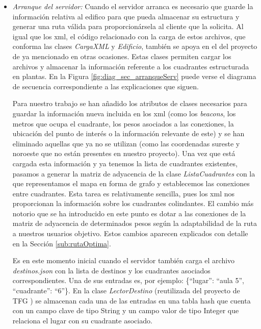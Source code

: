 \begin{itemize}
	\item \textit{Arranque del servidor:} Cuando el servidor arranca es necesario que guarde la información relativa al edifico para que pueda almacenar su estructura y generar una ruta válida para proporcionársela al cliente que la solicita. Al igual que los xml, el código relacionado con la carga de estos archivos, que conforma las clases \textit{CargaXML} y \textit{Edificio}, también se apoya en el del proyecto de \cite{TFGguia} ya mencionado en otras ocasiones. Estas clases permiten cargar los archivos y almacenar la información referente a los cuadrantes estructurada en plantas. En la Figura \ref{fig:diag_sec_arranqueServ} puede verse el diagrama de secuencia correspondiente a las explicaciones que siguen.
	
	Para nuestro trabajo se han añadido los atributos de clases necesarios para guardar la información nueva incluida en los xml (como los \textit{beacons}, los metros que ocupa el cuadrante, los pesos asociados a las conexiones, la ubicación del punto de interés o la información relevante de este) y se han eliminado aquellas que ya no se utilizan (como las coordenadas sureste y noroeste que no están presentes en nuestro proyecto). Una vez que está cargada esta información y ya tenemos la lista de cuadrantes existentes, pasamos a generar la matriz de adyacencia de la clase \textit{ListaCuadrantes} con la que representamos el mapa en forma de grafo y establecemos las conexiones entre cuadrantes. Esta tarea es relativamente sencilla, pues los xml nos proporcionan la información sobre los cuadrantes colindantes. El cambio más notorio que se ha introducido en este punto es dotar a las conexiones de la matriz de adyacencia de determinados pesos según la adaptabilidad de la ruta a nuestros usuarios objetivo. Estos cambios aparecen explicados con detalle en la Sección \ref{sub:rutaOptima}. 
	
	Es en este momento inicial cuando el servidor también carga el archivo \textit{destinos.json} con la lista de destinos y los cuadrantes asociados correspondientes. Una de sus entradas es, por ejemplo: \{``lugar'': ``aula 5'', ``cuadrante'': ``6''\}. En la clase \textit{LectorDestino} (reutilizada del proyecto de TFG \citep{TFGguia}) se almacenan cada una de las entradas en una tabla hash que cuenta con un campo clave de tipo String y un campo valor de tipo Integer que relaciona el lugar con su cuadrante asociado. 
	

\end{itemize}
